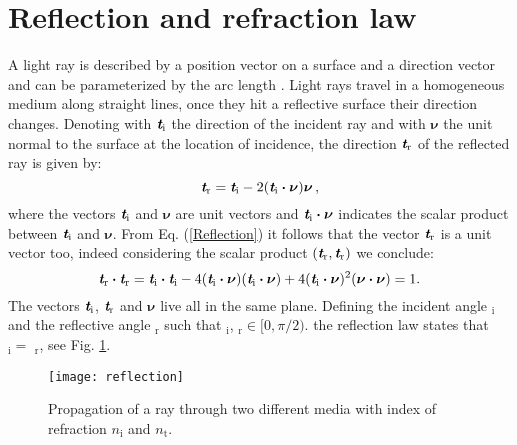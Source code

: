 \section{Reflection and refraction law}
A light ray is described by a position vector  on a surface and a direction vector  and can be parameterized by the arc length .
Light rays travel in a homogeneous medium along straight lines, once they hit a reflective surface their direction changes.
 Denoting with $\textit{\textbf{t}}_\textrm{i}$ the direction of the incident ray and with $\boldsymbol{\nu}$ the unit normal to the surface at the location of incidence, the direction $\textit{\textbf{t}}_\textrm{r}$ of the reflected ray is given by:
 \begin{equation}\label{Reflection}
  \textit{\textbf{t}}_\textrm{r} = \textit{\textbf{t}}_\textrm{i}-2 (\textit{\textbf{t}}_\textrm{i}\boldsymbol{\cdot}\boldsymbol{\nu})\boldsymbol{\nu}\,,
\end{equation}
where the vectors $\textit{\textbf{t}}_\textrm{i}$ and $\boldsymbol{\nu}$ are unit vectors and $\textit{\textbf{t}}_\textrm{i}\boldsymbol{\cdot}\boldsymbol{\nu}$ indicates the scalar product between 
$\textit{\textbf{t}}_\textrm{i}$ and $\boldsymbol{\nu}$. 
From Eq. (\ref{Reflection}) it follows that the vector  $\textit{\textbf{t}}_\textrm{r}$ is a unit vector too, indeed considering the scalar product $(\textit{\textbf{t}}_\textrm{r},\textit{\textbf{t}}_\textrm{r})$ we conclude:
\begin{equation}\label{unit_vector}
\textit{\textbf{t}}_\textrm{r}\boldsymbol{\cdot}\textit{\textbf{t}}_\textrm{r} = \textit{\textbf{t}}_\textrm{i}\boldsymbol{\cdot}\textit{\textbf{t}}_\textrm{i} 
- 4(\textit{\textbf{t}}_\textrm{i}\boldsymbol{\cdot}\boldsymbol{\nu})(\textit{\textbf{t}}_\textrm{i}\boldsymbol{\cdot}\boldsymbol{\nu})+
4(\textit{\textbf{t}}_\textrm{i}\boldsymbol{\cdot}\boldsymbol{\nu})^2(\boldsymbol{\nu}\boldsymbol{\cdot}\boldsymbol{\nu})=1 .
\end{equation} 
The vectors $\textit{\textbf{t}}_\textrm{i}$, $\textit{\textbf{t}}_\textrm{r}$ and $\boldsymbol{\nu}$ live all in the same plane.
Defining the incident angle \myangle$_\textrm{i}$ and the reflective angle \myangle$_\textrm{r}$ such that \myangle$_\textrm{i}$, \myangle$_\textrm{r} \in[0, \pi/2)$.
the reflection law states that \myangle$_\textrm{i}=$ \myangle$_\textrm{r}$, see Fig. \ref{fig:Snell}.
\begin{figure}[h]
 \label{fig:Snell}
     \begin{center}
     \texttt{[image: reflection]}
     \end{center}
     \caption{Propagation of a ray through two different media with index of refraction $n_\textrm{i}$ and $n_\textrm{t}$.}%
\label{fig:Snell}
 \end{figure}
